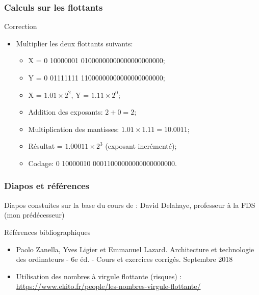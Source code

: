 \documentclass{beamer}
\begin{document}
\begin{frame}
\frametitle{Calculs sur les flottants}

\begin{block}{Correction}
\begin{itemize}
\item Multiplier les deux flottants suivants:
\begin{itemize}
\item X = 0 10000001 01000000000000000000000;
\item Y = 0 01111111 11000000000000000000000;
\item X = $1.01\times{}2^2$, Y = $1.11\times{}2^0$;
\item Addition des exposants: $2+0=2$;
\item Multiplication des mantisses: $1.01\times{}1.11=10.0011$;
\item Résultat = $1.00011\times{}2^3$ (exposant incrémenté);
\item Codage: 0 10000010 00011000000000000000000.
\end{itemize}
\end{itemize}
\end{block}
\end{frame}

\begin{frame}
\frametitle{Diapos et références}

\begin{block}{Diapos constuites sur la base du cours de :}
  David Delahaye, professeur à la FDS (mon prédécesseur)
\end{block}

\begin{block}{Références bibliographiques}
\begin{itemize}
\item Paolo Zanella, Yves Ligier et Emmanuel Lazard. Architecture et
  technologie des ordinateurs - 6e éd. - Cours et exercices
  corrigés. Septembre 2018
\item Utilisation des nombres à virgule flottante (risques) :\\
  \footnotesize
  \url{https://www.ekito.fr/people/les-nombres-virgule-flottante/}
  \normalsize
\end{itemize}
\end{block}

\end{frame}
\end{document}
